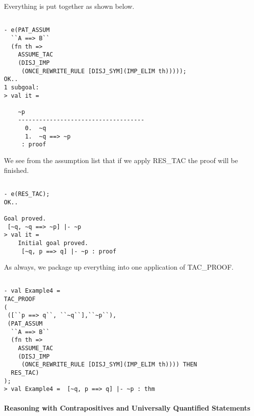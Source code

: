 Everything is put together as shown below.
\begin{session}
  \begin{scriptsize}
\begin{verbatim}

- e(PAT_ASSUM 
  ``A ==> B`` 
  (fn th => 
    ASSUME_TAC 
    (DISJ_IMP 
     (ONCE_REWRITE_RULE [DISJ_SYM](IMP_ELIM th)))));
OK..
1 subgoal:
> val it =
    
    ~p
    ------------------------------------
      0.  ~q
      1.  ~q ==> ~p
     : proof
\end{verbatim}
  \end{scriptsize}
\end{session}
We see from the assumption list that if we apply RES\_TAC the proof
will be finished.
\begin{session}
  \begin{scriptsize}
\begin{verbatim}

- e(RES_TAC);
OK..

Goal proved.
 [~q, ~q ==> ~p] |- ~p
> val it =
    Initial goal proved.
     [~q, p ==> q] |- ~p : proof
\end{verbatim}
  \end{scriptsize}
\end{session}
As always, we package up everything into one application of
TAC\_PROOF.
\begin{session}
  \begin{scriptsize}
\begin{verbatim}

- val Example4 =
TAC_PROOF
(
 ([``p ==> q``, ``~q``],``~p``),
 (PAT_ASSUM 
  ``A ==> B`` 
  (fn th => 
    ASSUME_TAC 
    (DISJ_IMP 
     (ONCE_REWRITE_RULE [DISJ_SYM](IMP_ELIM th)))) THEN
  RES_TAC)
);
> val Example4 =  [~q, p ==> q] |- ~p : thm
\end{verbatim}
  \end{scriptsize}
\end{session}

\paragraph*{Reasoning with Contrapositives and Universally Quantified Statements}

